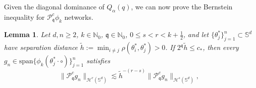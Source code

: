\documentclass{article}
\numberwithin{equation}{section}
\newtheorem{lemma}{Lemma}
\def\NN{\mathbb{N}}
\def\SS{\mathbb{S}}
\def\pc{\mathcal{P}^c}
\def\mq{\mathfrak{q}}
\begin{document}
Given the diagonal dominance of $Q_\alpha(q)$, we can now prove the Bernstein inequality for $\pc_\mq\phi_k$ networks.

\begin{lemma}\label{lem:inverse_phi_k}
    Let $d,n\geq2$, $k\in\NN_0$, $\mq\in\NN_0$, $0\leq s<r<k+\frac12$, and let $\{\theta_j^*\}_{j=1}^n\subset\SS^d$ have separation distance $\tilde h:=\min_{i\neq j}\rho(\theta_i^*,\theta_j^*)>0$.
    If $2^\mq\tilde h\leq c_*$, then every $g_n\in\mathrm{span}\{\phi_k(\theta_j^*\cdot\circ)\}_{j=1}^n$ satisfies
    \begin{equation}
        \|\pc_\mq g_n\|_{\mathcal H^r(\SS^d)}\lesssim \tilde{h}^{-(r-s)}\|\pc_\mq g_n\|_{\mathcal{H}^s(\SS^d)},
    \end{equation}
\end{lemma}
\end{document}
